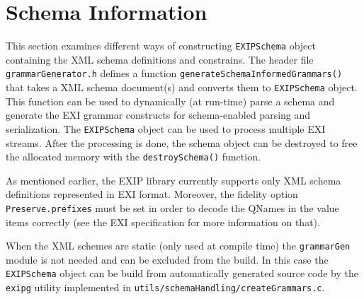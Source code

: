\section{Schema Information}
\label{sec:Schema-Infromation}

This section examines different ways of constructing \texttt{EXIPSchema} object
containing the XML schema definitions and constrains. The header file \texttt{grammarGenerator.h}
defines a function \texttt{generateSchemaInformedGrammars()} that takes a XML schema document(s) and converts them to 
\texttt{EXIPSchema} object. This function can be used to dynamically (at run-time)
parse a schema and generate the EXI grammar constructs for schema-enabled
parsing and serialization. The \texttt{EXIPSchema} object can be used to process
multiple EXI streams. After the processing is done, the schema object can be destroyed
to free the allocated memory with the \texttt{destroySchema()} function.

As mentioned earlier, the EXIP library currently supports
only XML schema definitions represented in EXI format. Moreover, the fidelity option \texttt{Preserve.prefixes} must be
set in order to decode the QNames in the value items correctly (see the EXI specification for
more information on that).

When the XML schemes are static (only used at
compile time) the \texttt{grammarGen} module is not needed and can be excluded from the build.
In this case the \texttt{EXIPSchema} object can be build from automatically generated source code
by the \texttt{exipg} utility implemented in \texttt{utils/schemaHandling/createGrammars.c}.

